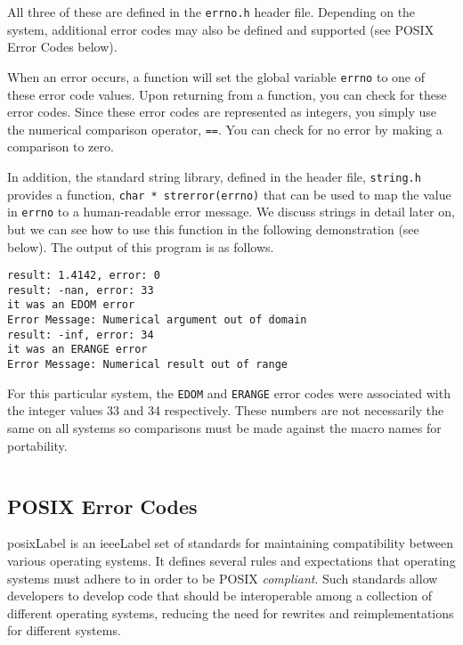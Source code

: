 All three of these are defined in the \texttt{errno.h} header file.
Depending on the system, additional error codes may also be defined
and supported (see POSIX Error Codes below).  

When an error occurs, a function will set the global variable 
\texttt{errno} to one of these error code values.  Upon returning 
from a function, you can check for these error codes.  Since these 
error codes are represented as integers, you simply use the numerical 
comparison operator, \texttt{==}.  You can check for no error
by making a comparison to zero.

In addition, the standard string library, defined in the header file, 
\texttt{string.h} provides a function, 
\texttt{char * strerror(errno)} that can be used to map 
the value in \texttt{errno} to a human-readable error message.  
We discuss strings in detail later on, but we can see how to use this 
function in the following demonstration (see below).  The output of this 
program is as follows.

\begin{verbatim}
result: 1.4142, error: 0
result: -nan, error: 33
it was an EDOM error
Error Message: Numerical argument out of domain
result: -inf, error: 34
it was an ERANGE error
Error Message: Numerical result out of range
\end{verbatim}

For this particular system, the \texttt{EDOM} and 
\texttt{ERANGE} error codes were associated with the
integer values 33 and 34 respectively.  These numbers are 
not necessarily the same on all systems so comparisons must 
be made against the macro names for portability.

\inputminted{c}{code/errorDemo.c}

\subsection{POSIX Error Codes}

\gls{posixLabel} is an \gls{ieeeLabel} set of standards for maintaining compatibility between
various operating systems.  It defines several rules and expectations
that operating systems must adhere to in order to be POSIX 
\emph{compliant}.  Such standards allow developers to develop 
code that should be interoperable among a collection of different
operating systems, reducing the need for rewrites and reimplementations
for different systems.

